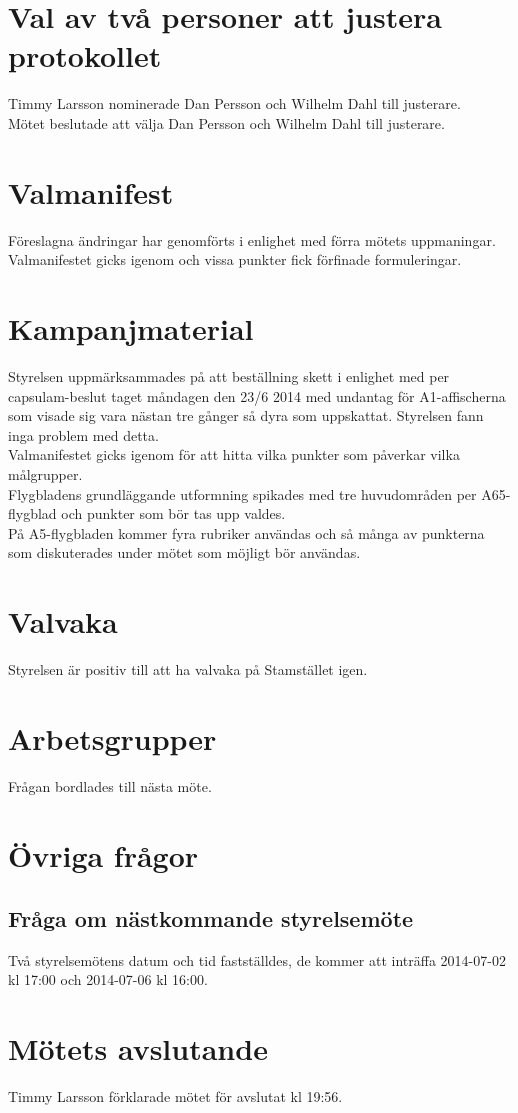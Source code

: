 \documentclass[a4paper,10pt]{article}
\begin{document}
\section{Val av två personer att justera protokollet}
Timmy Larsson nominerade Dan Persson och Wilhelm Dahl till justerare.\\
Mötet beslutade att välja Dan Persson och Wilhelm Dahl till justerare.

\section{Valmanifest}
Föreslagna ändringar har genomförts i enlighet med förra mötets uppmaningar. \\
Valmanifestet gicks igenom och vissa punkter fick förfinade formuleringar.

\section{Kampanjmaterial}
Styrelsen uppmärksammades på att beställning skett i enlighet med per capsulam-beslut taget måndagen den 23/6 2014 med undantag för A1-affischerna som visade sig vara nästan tre gånger så dyra som uppskattat. Styrelsen fann inga problem med detta. \\
Valmanifestet gicks igenom för att hitta vilka punkter som påverkar vilka målgrupper. \\
Flygbladens grundläggande utformning spikades med tre huvudområden per A65-flygblad och punkter som bör tas upp valdes. \\
På A5-flygbladen kommer fyra rubriker användas och så många av punkterna som diskuterades under mötet som möjligt bör användas.

\section{Valvaka}
Styrelsen är positiv till att ha valvaka på Stamstället igen.

\section{Arbetsgrupper}
Frågan bordlades till nästa möte.

\section{Övriga frågor}
\subsection*{Fråga om nästkommande styrelsemöte}
Två styrelsemötens datum och tid fastställdes, de kommer att inträffa 2014-07-02 kl 17:00 och 2014-07-06 kl 16:00.

\section{Mötets avslutande}
Timmy Larsson förklarade mötet för avslutat kl 19:56.
\end{document}
